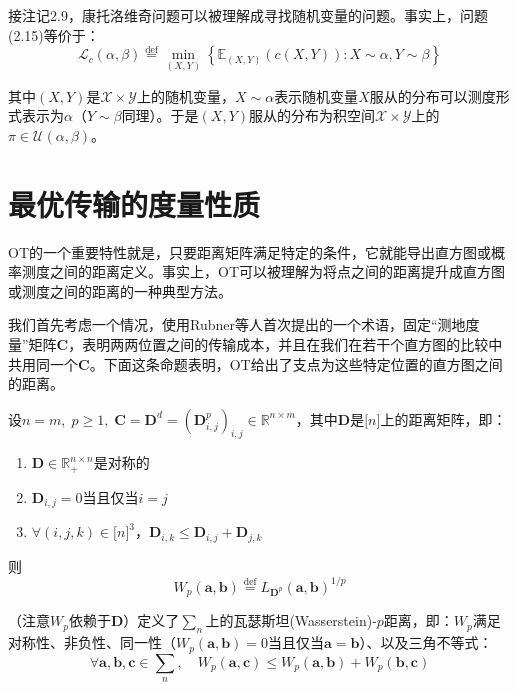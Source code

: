 \documentclass[cn,10pt,math=newtx,citestyle=gb7714-2015,bibstyle=gb7714-2015]{elegantbook}
\begin{document}
\begin{postulate}[从概率论角度的理解]

接注记2.9，康托洛维奇问题可以被理解成寻找随机变量的问题。事实上，问题(2.15)等价于：
\begin{equation}
    \label{2.16}
    \mathcal{L}_c(\alpha,\beta)\overset{\text{def}}{=}\min\limits_{(X,Y)} \left\{ \mathbb{E}_{(X,Y)}(c(X,Y)):X\sim \alpha, Y\sim \beta \right\}
\end{equation}

其中$(X,Y)$是$\mathcal{X}\times \mathcal{Y}$上的随机变量，$X\sim\alpha$表示随机变量$X$服从的分布可以测度形式表示为$\alpha$（$Y\sim\beta$同理）。于是$(X,Y)$服从的分布为积空间$\mathcal{X}\times \mathcal{Y}$上的$\pi\in\mathcal{U}(\alpha,\beta)$。

\end{postulate}

\section{最优传输的度量性质}

OT的一个重要特性就是，只要距离矩阵满足特定的条件，它就能导出直方图或概率测度之间的距离定义。事实上，OT可以被理解为将点之间的距离提升成直方图或测度之间的距离的一种典型方法。

我们首先考虑一个情况，使用Rubner等人首次提出的一个术语，固定“测地度量”矩阵$\mathbf{C}$，表明两两位置之间的传输成本，并且在我们在若干个直方图的比较中共用同一个$\mathbf{C}$。下面这条命题表明，OT给出了支点为这些特定位置的直方图之间的距离。

\begin{proposition}
设$n=m,\;p\geq 1,\; \mathbf{C}=\mathbf{D}^d=(\mathbf{D}_{i,j}^p)_{i,j}\in\mathbb{R}^{n\times m}$，其中$\mathbf{D}$是$\mathbb{[}n\mathbb{]}$上的距离矩阵，即：

\begin{enumerate}
    \item $\mathbf{D}\in\mathbb{R}_+^{n\times n}$是对称的
    \item $\mathbf{D}_{i,j}=0$当且仅当$i=j$
    \item $\forall (i,j,k)\in\mathbb{[}n\mathbb{]}^3$，$\mathbf{D}_{i,k}\leq \mathbf{D}_{i,j}+\mathbf{D}_{j,k}$
\end{enumerate}

则
\begin{equation}
    \label{2.17}
    W_p(\mathbf{a,b})\overset{\text{def}}{=}L_{\mathbf{D}^p}(\mathbf{a,b})^{1/p}
\end{equation}

（注意$W_p$依赖于$\mathbf{D}$）定义了$\sum_n$上的瓦瑟斯坦(Wasserstein)-$p$距离，即：$W_p$满足对称性、非负性、同一性（$W_p(\mathbf{a,b})=0$当且仅当$\mathbf{a}=\mathbf{b}$）、以及三角不等式：
\begin{equation*}
    \forall \mathbf{a,b,c}\in\sum_n,\quad W_p(\mathbf{a,c})\leq W_p(\mathbf{a,b})+W_p(\mathbf{b,c})
\end{equation*}

\end{proposition}
\end{document}

